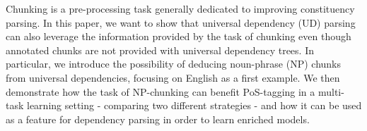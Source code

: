 Chunking is a pre-processing task generally dedicated to improving constituency parsing. In this paper, we want to show that universal dependency (UD) parsing can also leverage the information provided by the task of chunking even though annotated chunks are not provided with universal dependency trees. In particular, we introduce the possibility of deducing noun-phrase (NP) chunks from universal dependencies, focusing on English as a first example. We then demonstrate how the task of NP-chunking can benefit PoS-tagging in a multi-task learning setting - comparing two different strategies - and how it can be used as a feature for dependency parsing in order to learn enriched models.
